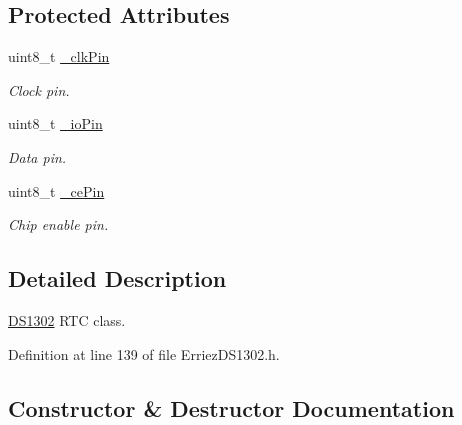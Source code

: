 \subsection*{Protected Attributes}
\begin{DoxyCompactItemize}
\item 
uint8\+\_\+t \hyperlink{class_d_s1302_aa6c120424fba3bad0526c12e1dd87ef8}{\+\_\+clk\+Pin}\hypertarget{class_d_s1302_aa6c120424fba3bad0526c12e1dd87ef8}{}\label{class_d_s1302_aa6c120424fba3bad0526c12e1dd87ef8}

\begin{DoxyCompactList}\small\item\em Clock pin. \end{DoxyCompactList}\item 
uint8\+\_\+t \hyperlink{class_d_s1302_afc35e276d666091464d58c48a9191582}{\+\_\+io\+Pin}\hypertarget{class_d_s1302_afc35e276d666091464d58c48a9191582}{}\label{class_d_s1302_afc35e276d666091464d58c48a9191582}

\begin{DoxyCompactList}\small\item\em Data pin. \end{DoxyCompactList}\item 
uint8\+\_\+t \hyperlink{class_d_s1302_ad187c323edcbacb3283c4a91b186695e}{\+\_\+ce\+Pin}\hypertarget{class_d_s1302_ad187c323edcbacb3283c4a91b186695e}{}\label{class_d_s1302_ad187c323edcbacb3283c4a91b186695e}

\begin{DoxyCompactList}\small\item\em Chip enable pin. \end{DoxyCompactList}\end{DoxyCompactItemize}


\subsection{Detailed Description}
\hyperlink{class_d_s1302}{D\+S1302} R\+TC class. 

Definition at line 139 of file Erriez\+D\+S1302.\+h.



\subsection{Constructor \& Destructor Documentation}
